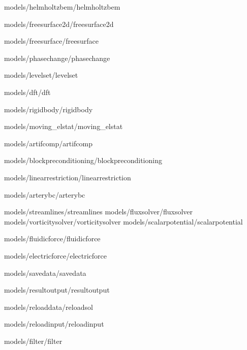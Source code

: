 \documentclass[a4paper,english,10pt]{report}    %
\newcommand{\Include}{} %
\begin{document}
\graphicspath{{./}{helmholtzbem/}}
\Include{models/helmholtzbem/helmholtzbem}

\graphicspath{{./}{freesurface2d/}}
\Include{models/freesurface2d/freesurface2d}

\graphicspath{{./}{freesurface/}}
\Include{models/freesurface/freesurface}

\graphicspath{{./}{phasechange/}}
\Include{models/phasechange/phasechange}


\graphicspath{{./}{levelset/}}
\Include{models/levelset/levelset}

\graphicspath{{./}{dft/}}
\Include{models/dft/dft}

\graphicspath{{./}{rigidbody/}}
\Include{models/rigidbody/rigidbody}

\graphicspath{{./}{moving_elstat/}}
\Include{models/moving_elstat/moving_elstat}

\graphicspath{{./}{artifcomp/}}
\Include{models/artifcomp/artifcomp}

\graphicspath{{./}{blockpreconditioning/}}
\Include{models/blockpreconditioning/blockpreconditioning}


\graphicspath{{./}{linearrestriction/}}
\Include{models/linearrestriction/linearrestriction}

\graphicspath{{./}{arterybc/}}
\Include{models/arterybc/arterybc}

\graphicspath{{./}{streamlines/}}
\Include{models/streamlines/streamlines}
\Include{models/fluxsolver/fluxsolver}
\Include{models/vorticitysolver/vorticitysolver}
\Include{models/scalarpotential/scalarpotential}

\Include{models/fluidicforce/fluidicforce}
\graphicspath{{./}{electricforce/}}
\Include{models/electricforce/electricforce}

\graphicspath{{./}{savedata/}}
\Include{models/savedata/savedata}

\graphicspath{{./}{resultoutput/}}
\Include{models/resultoutput/resultoutput}

\graphicspath{{./}{reloaddata/}}
\Include{models/reloaddata/reloadsol}

\graphicspath{{./}{reloadinput/}}
\Include{models/reloadinput/reloadinput}

\graphicspath{{./}{filter/}}
\Include{models/filter/filter}


\printindex

\end{document}
